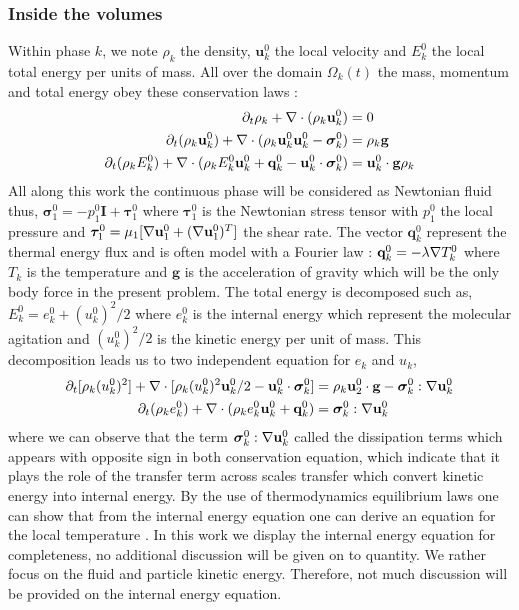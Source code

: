 \subsubsection{Inside the volumes}
Within phase $k$, we note $\rho_k$ the density, $\textbf{u}_k^0$ the local velocity and $E_k^0$ the local total energy per units of mass.
All over the domain $\Omega_k(t)$ the mass, momentum and total energy obey these conservation laws :
\begin{align}
    \label{eq:dt_rho}
    \partial_t \rho_k  
    + \mathbf{\nabla}\cdot (
        \rho_k\textbf{u}_k^0
    )
    &= 
    0\\
    \label{eq:dt_rhou_k}
    \partial_t (\rho_k\textbf{u}_k^0)  
    + \mathbf{\nabla}\cdot (
        \rho_k\textbf{u}_k^0\textbf{u}_k^0
        - \bm{\sigma}_k^0 
    )
    &= 
    \rho_k \textbf{g}\\
    \label{eq:dt_rhoE_k}
    \partial_t (\rho_kE_k^0)  
    + \mathbf{\nabla}\cdot (
        \rho_kE_k^0\textbf{u}_k^0
        + \textbf{q}_k^0
        - \textbf{u}_k^0 \cdot \bm{\sigma}_k^0 
        )
    &= 
    \textbf{u}_k^0 \cdot \textbf{g}  \rho_k
\end{align} 
All along this work the continuous phase will be considered as Newtonian fluid thus, $\bm{\sigma}_1^0 = - p_1^0 \textbf{I} + \bm{\tau}_1^0$ where $\bm{\tau}_1^0$ is the Newtonian stress tensor with $p_1 ^0$ the local pressure and $\bm{\tau}_1^0 = \mu_1[\mathbf{\nabla} \textbf{u}_1^0+(\mathbf{\nabla} \textbf{u}_1^0)^T]$ the shear rate. 
The vector $\textbf{q}_k^0$ represent the thermal energy flux and is often model with a Fourier law : $\textbf{q}_k^0 = -\lambda \mathbf{\nabla} T_k^0$ where $T_k$ is the temperature and $\textbf{g}$ is the acceleration of gravity which will be the only body force in the present problem. 
The total energy is decomposed such as, $E_k^0 = e_k^0 + (u_k^0)^2/2$ where  $e_k^0$ is the internal energy which represent the molecular agitation and $(u_k^0)^2/2$ is the kinetic energy per unit of mass.
This decomposition leads us to two independent equation for $e_k$ and $u_k$, 
\begin{align}
    \label{eq:dt_rhou_k2}
    \partial_t [\rho_k(u_k^0)^2]  
    + \mathbf{\nabla}\cdot [\rho_k(u_k^0)^2\textbf{u}_k^0/2 - \textbf{u}_k^0 \cdot \bm{\sigma}_k^0]
    &=
    \rho_k\textbf{u}_2^0 \cdot \textbf{g}  
    -  \bm{\sigma}_k^0 : \mathbf{\nabla} \textbf{u}_k^0 
    \\
    \label{eq:dt_rhoe_k}
    \partial_t (\rho_ke_k^0)  
    + \mathbf{\nabla}\cdot (
        \rho_ke_k^0\textbf{u}_k^0
        + \textbf{q}_k^0
        )
    &= 
    \bm{\sigma}_k^0 : \mathbf{\nabla} \textbf{u}_k^0
\end{align} 
where we can observe that the term $\bm{\sigma}_k^0 : \mathbf{\nabla} \textbf{u}_k^0$ called the dissipation terms which appears with opposite sign in both conservation equation, which indicate that it plays the role of the transfer term across scales transfer which convert kinetic energy into internal energy. 
By the use of thermodynamics equilibrium laws one can show that from the internal energy equation one can derive an equation for the local temperature \citet{ishii2010thermo}.
In this work we display the internal energy equation for completeness, no additional discussion will be given on to quantity. 
We rather focus on the fluid and particle kinetic energy. 
Therefore, not much discussion will be provided on the internal energy equation. 


